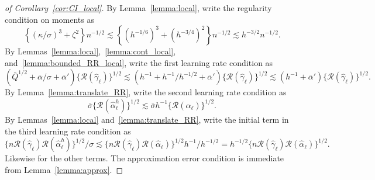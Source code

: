 \begin{proof}[of Corollary~\ref{cor:CI_local}]
By Lemma~\ref{lemma:local}, write the regularity condition on moments as
$$
\left\{\left(\kappa/\sigma\right)^3+\zeta^2\right\}n^{-1/2}\lesssim \left\{\left(h^{-1/6}\right)^3+(h^{-3/4})^2\right\}n^{-1/2}\lesssim h^{-3/2} n^{-1/2}.
$$
By Lemmas~\ref{lemma:local},~\ref{lemma:cont_local}, and~\ref{lemma:bounded_RR_local}, write the first learning rate condition as
$$
\left(\bar{Q}^{1/2}+\bar{\alpha}/\sigma+\bar{\alpha}'\right)\{\mathcal{R}(\hat{\gamma}_{\ell})\}^{1/2} 
\lesssim \left(h^{-1}+h^{-1}/h^{-1/2}+\bar{\alpha}'\right)\{\mathcal{R}(\hat{\gamma}_{\ell})\}^{1/2} 
\lesssim \left(h^{-1}+\bar{\alpha}'\right)\{\mathcal{R}(\hat{\gamma}_{\ell})\}^{1/2}.
$$
By Lemma~\ref{lemma:translate_RR}, write the second learning rate condition as
$$
\bar{\sigma}\{\mathcal{R}(\hat{\alpha}^h_{\ell})\}^{1/2} \lesssim \bar{\sigma}h^{-1}\{\mathcal{R}(\hat{\alpha}_{\ell})\}^{1/2}.
$$
By Lemmas~\ref{lemma:local} and~\ref{lemma:translate_RR}, write the initial term in the third learning rate condition as
$$
\{n \mathcal{R}(\hat{\gamma}_{\ell}) \mathcal{R}(\hat{\alpha}^h_{\ell})\}^{1/2}  /\sigma 
\lesssim \{n \mathcal{R}(\hat{\gamma}_{\ell}) \mathcal{R}(\hat{\alpha}_{\ell})\}^{1/2}  h^{-1}/h^{-1/2}
=h^{-1/2}\{n \mathcal{R}(\hat{\gamma}_{\ell}) \mathcal{R}(\hat{\alpha}_{\ell})\}^{1/2}.
$$
Likewise for the other terms. The approximation error condition is immediate from Lemma~\ref{lemma:approx}.
\end{proof}